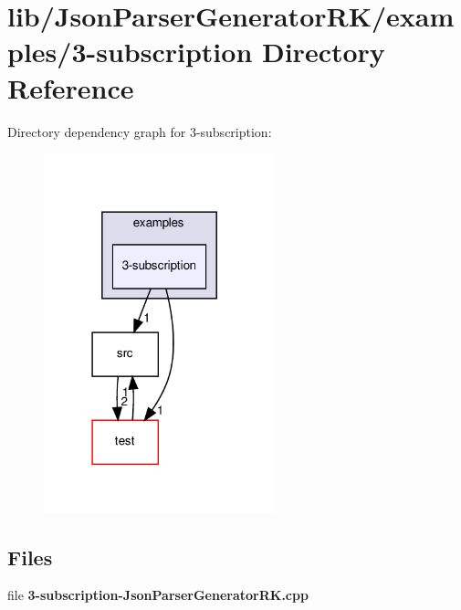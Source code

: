 \section{lib/\+Json\+Parser\+Generator\+R\+K/examples/3-\/subscription Directory Reference}
\label{dir_7f58a97c2a100bea914ac50ee7b8805c}
Directory dependency graph for 3-\/subscription\+:\nopagebreak
\begin{figure}[H]
\begin{center}
\leavevmode
\includegraphics[width=190pt]{dir_7f58a97c2a100bea914ac50ee7b8805c_dep}
\end{center}
\end{figure}
\subsection*{Files}
\begin{DoxyCompactItemize}
\item 
file \textbf{ 3-\/subscription-\/\+Json\+Parser\+Generator\+R\+K.\+cpp}
\end{DoxyCompactItemize}
